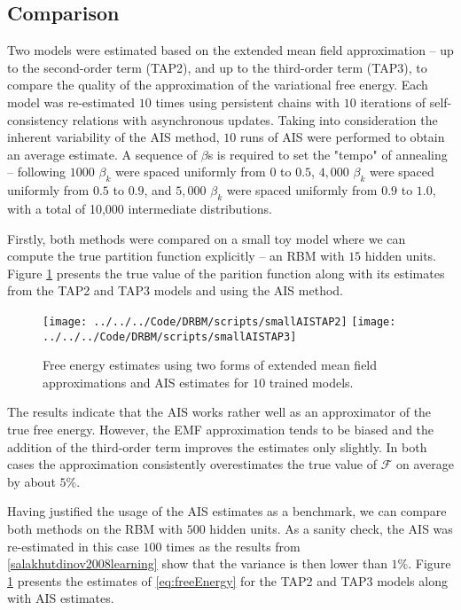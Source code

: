 \subsection{Comparison}
Two models were estimated based on the extended mean field approximation -- up to the second-order term (TAP2), and up to the third-order term (TAP3), to compare the quality of the approximation of the variational free energy.
Each model was re-estimated $10$ times using persistent chains with $10$ iterations of self-consistency relations with asynchronous updates. Taking into consideration the inherent variability of the AIS method, $10$ runs of AIS were performed to obtain an average estimate.  A sequence of $\beta$s is required to set the "tempo" of annealing -- following \cite{salakhutdinov2008learning} $1000$ $\beta_k$ were spaced uniformly from  $0 $ to  $0.5$, $4,000$ $\beta_k$ were spaced uniformly from $0.5$ to $0.9$, and $5,000$ $\beta_k$ were spaced uniformly from $0.9$ to $1.0$, with a total of 10,000 intermediate distributions. 

Firstly, both methods were compared on a small toy model where we can compute the true partition function explicitly -- an RBM with $15$ hidden units. Figure \ref{fig:AISTAP2small} presents the true value of the parition function along with its estimates from the TAP2 and TAP3 models and using the AIS method.

\begin{figure}[!htb]
%
 \texttt{[image: ../../../Code/DRBM/scripts/smallAISTAP2]}
\endminipage 
{}  
\texttt{[image: ../../../Code/DRBM/scripts/smallAISTAP3]}
\endminipage\hfill
  \caption[Comparison of AIS and EMF on toy RBM]{Free energy estimates using two forms of extended mean field approximations and AIS estimates for $10$ trained models.}
  \label{fig:AISTAP2small}
\end{figure}

The results indicate that the AIS works rather well as an approximator of the true free energy. However, the EMF approximation tends to be biased and the addition of the third-order term improves the estimates only slightly. In both cases the approximation consistently overestimates the true value of $\mathcal{F}$ on average by about $5\%$. 

Having justified the usage of the AIS estimates as a benchmark, we can compare both methods on the RBM with $500$ hidden units. As a sanity check, the AIS was re-estimated in this case $100$ times as the results from \ref{salakhutdinov2008learning} show that the variance is then lower than $1\%$. Figure \ref{fig:AISTAP2small} presents the estimates of \ref{eq:freeEnergy} for the TAP2 and TAP3 models along with AIS estimates.

